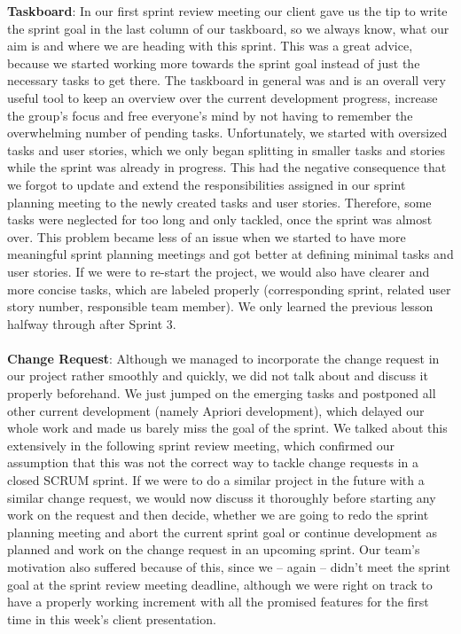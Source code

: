 \textbf{Taskboard}: In our first sprint review meeting our client gave us the tip to write the sprint goal in the last column of our taskboard, so we always know, what our aim is and where we are heading with this sprint. This was a great advice, because we started working more towards the sprint goal instead of just the necessary tasks to get there. The taskboard in general was and is an overall very useful tool to keep an overview over the current development progress, increase the group’s focus and free everyone’s mind by not having to remember the overwhelming number of pending tasks. Unfortunately, we started with oversized tasks and user stories, which we only began splitting in smaller tasks and stories while the sprint was already in progress. This had the negative consequence that we forgot to update and extend the responsibilities assigned in our sprint planning meeting to the newly created tasks and user stories. Therefore, some tasks were neglected for too long and only tackled, once the sprint was almost over. This problem became less of an issue when we started to have more meaningful sprint planning meetings and got better at defining minimal tasks and user stories. If we were to re-start the project, we would also have clearer and more concise tasks, which are labeled properly (corresponding sprint, related user story number, responsible team member). We only learned the previous lesson halfway through after Sprint 3.\\
\ \\
\textbf{Change Request}: Although we managed to incorporate the change request in our project rather smoothly and quickly, we did not talk about and discuss it properly beforehand. We just jumped on the emerging tasks and postponed all other current development (namely Apriori development), which delayed our whole work and made us barely miss the goal of the sprint. We talked about this extensively in the following sprint review meeting, which confirmed our assumption that this was not the correct way to tackle change requests in a closed SCRUM sprint. If we were to do a similar project in the future with a similar change request, we would now discuss it thoroughly before starting any work on the request and then decide, whether we are going to redo the sprint planning meeting and abort the current sprint goal or continue development as planned and work on the change request in an upcoming sprint. Our team’s motivation also suffered because of this, since we – again – didn’t meet the sprint goal at the sprint review meeting deadline, although we were right on track to have a properly working increment with all the promised features for the first time in this week’s client presentation. \\
